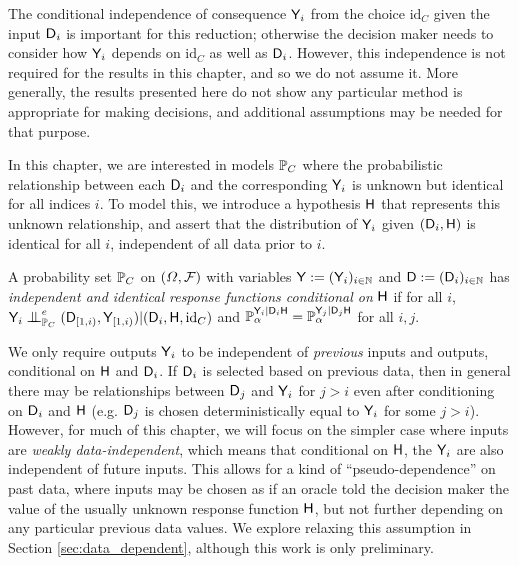 The conditional independence of consequence $\mathsf{Y}_i$ from the choice $\text{id}_C$ given the input $\mathsf{D}_i$ is important for this reduction; otherwise the decision maker needs to consider how $\mathsf{Y}_i$ depends on $\text{id}_C$ as well as $\mathsf{D}_i$. However, this independence is not required for the results in this chapter, and so we do not assume it. More generally, the results presented here do not show any particular method is appropriate for making decisions, and additional assumptions may be needed for that purpose.

In this chapter, we are interested in models $\mathbb{P}_C$ where the probabilistic relationship between each $\mathsf{D}_i$ and the corresponding $\mathsf{Y}_i$ is unknown but identical for all indices $i$. To model this, we introduce a hypothesis $\mathsf{H}$ that represents this unknown relationship, and assert that the distribution of $\mathsf{Y}_i$ given $(\mathsf{D}_i,\mathsf{H})$ is identical for all $i$, independent of all data prior to $i$.

\begin{definition}\label{def:cii_rf}
A probability set $\mathbb{P}_C$ on $(\Omega,\mathcal{F})$ with variables $\mathsf{Y}:=(\mathsf{Y}_i)_{i\in \mathbb{N}}$ and $\mathsf{D}:=(\mathsf{D}_i)_{i\in\mathbb{N}}$ has \emph{independent and identical response functions conditional on} $\mathsf{H}$ if for all $i$, $\RV{Y}_i\CI^e_{\prob{P}_C} (\RV{D}_{[1,i)},\RV{Y}_{[1,i)})|(\RV{D}_i, \RV{H},\text{id}_C)$ and $\mathbb{P}_\alpha^{\mathsf{Y}_i|\mathsf{D}_i\mathsf{H}}=\mathbb{P}_\alpha^{\mathsf{Y}_j|\mathsf{D}_j\mathsf{H}}$ for all $i,j$.
\end{definition}

We only require outputs $\mathsf{Y}_i$ to be independent of \emph{previous} inputs and outputs, conditional on $\mathsf{H}$ and $\mathsf{D}_i$. If $\mathsf{D}_i$ is selected based on previous data, then in general there may be relationships between $\mathsf{D}_j$ and $\mathsf{Y}_i$ for $j>i$ even after conditioning on $\mathsf{D}_i$ and $\mathsf{H}$ (e.g. $\mathsf{D}_j$ is chosen deterministically equal to $\mathsf{Y}_i$ for some $j>i$). However, for much of this chapter, we will focus on the simpler case where inputs are \emph{weakly data-independent}, which means that conditional on $\mathsf{H}$, the $\mathsf{Y}_i$ are also independent of future inputs. This allows for a kind of ``pseudo-dependence'' on past data, where inputs may be chosen as if an oracle told the decision maker the value of the usually unknown response function $\mathsf{H}$, but not further depending on any particular previous data values. We explore relaxing this assumption in Section \ref{sec:data_dependent}, although this work is only preliminary.

